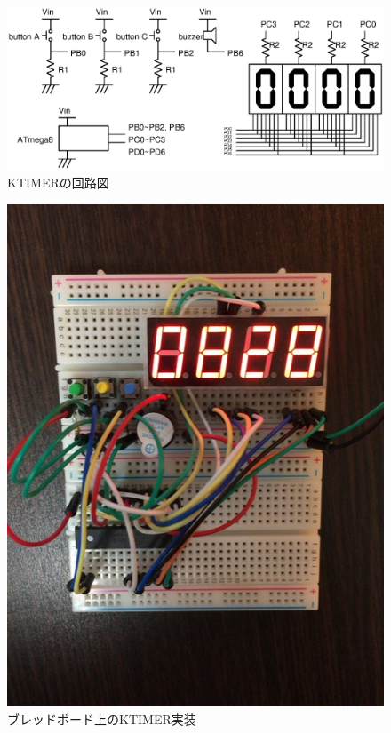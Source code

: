 \begin{figure}[h]
 \begin{center}
  \includegraphics[width=160mm]{figure/circuit.ps}
 \end{center}
 \caption{KTIMERの回路図}
 \label{fig:ktimer:circuit}
\end{figure}

\begin{figure}[h]
 \begin{center}
  \includegraphics[scale=0.8]{figure/craft.jpg}
 \end{center}
 \caption{ブレッドボード上のKTIMER実装}
 \label{fig:ktimer:picture}
\end{figure}

